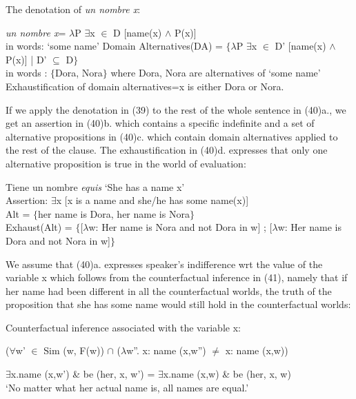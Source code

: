 \documentclass[output=paper
,modfonts
,nonflat]{langsci/langscibook}
\begin{document}
\ea The denotation of \textit{un nombre x}:
\begin{xlist}
\ex
{\textlbrackdbl \textit{un nombre x}\textrbrackdbl = $\lambda$P $\exists$x $\in$ D [name(x) $\wedge$ P(x)]}\\
in words: ‘some name’
\ex
{Domain Alternatives(DA) = $\lbrace$$\lambda$P $\exists$x $\in$ D’ [name(x) $\wedge$ P(x)] | D’ $\subseteq$ D$\rbrace$}\\
in words : $\lbrace$Dora, Nora$\rbrace$ where Dora, Nora are alternatives of ‘some name’
\ex
Exhaustification of domain alternatives=x is either Dora or Nora.
\end{xlist}
\z

If we apply the denotation in (39) to the rest of the whole sentence in (40)a., we get an assertion in (40)b. which contains a specific indefinite and a set of alternative propositions in (40)c. which contain domain alternatives applied to the rest of the clause. The exhaustification in (40)d. expresses that only one alternative proposition is true in the world of evaluation:

\ea
\begin{xlist}
\ex Tiene un nombre \textit{equis}  ‘She has a name x’\\
\ex Assertion: $\exists$x [x is a name and she/he has some name(x)]\\
\ex Alt = $\lbrace$her name is Dora, her name is Nora$\rbrace$\\
\ex Exhaust(Alt) = $\lbrace${[}$\lambda$w: Her name is Nora and not Dora in w{]} ; {[}$\lambda$w: Her name is Dora and not Nora in w{]}$\rbrace$\\
\end{xlist}
\z

We assume that (40)a. expresses speaker's indifference wrt the value of the variable x which follows from the counterfactual inference in (41), namely that if her name had been different in all the counterfactual worlds, the truth of the proposition that she has some name would still hold in the counterfactual worlds:

\ea
Counterfactual inference associated with the variable x:\par
($\forall$w’ $\in$ Sim (w, F(w)) $\cap$ ($\lambda$w”. x: name (x,w”) $≠$ x: name (x,w)) \par
$\exists$x.name (x,w’) \& be (her, x, w’) = $\exists$x.name (x,w) \& be (her, x, w)\\
\glt ‘No matter what her actual name is, all names are equal.’
\z
\end{document}
